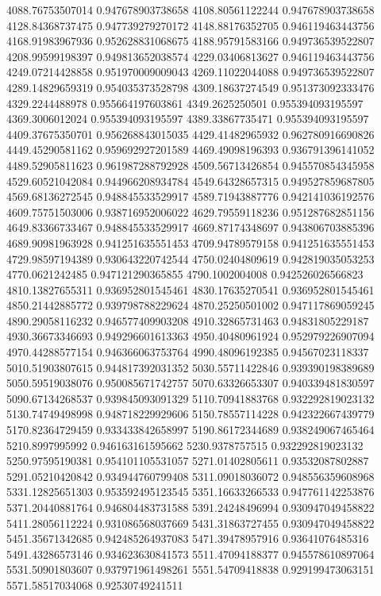 {4088.76753507014 0.947678903738658
4108.80561122244 0.947678903738658
4128.84368737475 0.947739279270172
4148.88176352705 0.946119463443756
4168.91983967936 0.952628831068675
4188.95791583166 0.949736539522807
4208.99599198397 0.949813652038574
4229.03406813627 0.946119463443756
4249.07214428858 0.951970009009043
4269.11022044088 0.949736539522807
4289.14829659319 0.954035373528798
4309.18637274549 0.951373092333476
4329.2244488978 0.955664197603861
4349.2625250501 0.955394093195597
4369.3006012024 0.955394093195597
4389.33867735471 0.955394093195597
4409.37675350701 0.956268843015035
4429.41482965932 0.962780916690826
4449.45290581162 0.959692927201589
4469.49098196393 0.936791396141052
4489.52905811623 0.961987288792928
4509.56713426854 0.945570854345958
4529.60521042084 0.944966208934784
4549.64328657315 0.949527859687805
4569.68136272545 0.948845533529917
4589.71943887776 0.942141036192576
4609.75751503006 0.938716952006022
4629.79559118236 0.951287682851156
4649.83366733467 0.948845533529917
4669.87174348697 0.943806703885396
4689.90981963928 0.941251635551453
4709.94789579158 0.941251635551453
4729.98597194389 0.930643220742544
4750.02404809619 0.942819035053253
4770.0621242485 0.947121290365855
4790.1002004008 0.942526026566823
4810.13827655311 0.936952801545461
4830.17635270541 0.936952801545461
4850.21442885772 0.939798788229624
4870.25250501002 0.947117869059245
4890.29058116232 0.946577409903208
4910.32865731463 0.94831805229187
4930.36673346693 0.949296601613363
4950.40480961924 0.952979226907094
4970.44288577154 0.946366063753764
4990.48096192385 0.94567023118337
5010.51903807615 0.944817392031352
5030.55711422846 0.939390198389689
5050.59519038076 0.950085671742757
5070.63326653307 0.940339481830597
5090.67134268537 0.939845093091329
5110.70941883768 0.932292819023132
5130.74749498998 0.948718229929606
5150.78557114228 0.942322667439779
5170.82364729459 0.933433842658997
5190.86172344689 0.938249067465464
5210.8997995992 0.946163161595662
5230.9378757515 0.932292819023132
5250.97595190381 0.954101105531057
5271.01402805611 0.93532087802887
5291.05210420842 0.934944760799408
5311.09018036072 0.948556359608968
5331.12825651303 0.953592495123545
5351.16633266533 0.947761142253876
5371.20440881764 0.946804483731588
5391.24248496994 0.930947049458822
5411.28056112224 0.931086568037669
5431.31863727455 0.930947049458822
5451.35671342685 0.942485264937083
5471.39478957916 0.93641076485316
5491.43286573146 0.934623630841573
5511.47094188377 0.945578610897064
5531.50901803607 0.937971961498261
5551.54709418838 0.929199473063151
5571.58517034068 0.92530749241511
}
